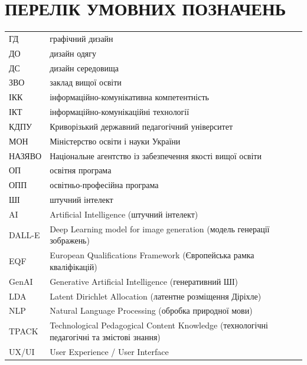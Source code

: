 \section*{\centering ПЕРЕЛІК УМОВНИХ ПОЗНАЧЕНЬ}

\begin{longtable}{@{}p{}p{}@{}}

ГД   & графічний дизайн \\
ДО   & дизайн одягу \\
ДС   & дизайн середовища \\
ЗВО  & заклад вищої освіти \\
ІКК  & інформаційно-комунікативна компетентність \\
ІКТ  & інформаційно-комунікаційні технології \\
КДПУ & Криворізький державний педагогічний університет \\
МОН  & Міністерство освіти і науки України \\
НАЗЯВО & Національне агентство із забезпечення якості вищої освіти \\
ОП   & освітня програма \\
ОПП  & освітньо-професійна програма \\
ШІ   & штучний інтелект \\

\addlinespace[6pt]
AI       & Artificial Intelligence (штучний інтелект) \\
DALL-E   & Deep Learning model for image generation (модель генерації зображень) \\
EQF      & European Qualifications Framework (Європейська рамка кваліфікацій) \\
GenAI    & Generative Artificial Intelligence (генеративний ШІ) \\
LDA      & Latent Dirichlet Allocation (латентне розміщення Діріхле) \\
NLP      & Natural Language Processing (обробка природної мови) \\
TPACK    & Technological Pedagogical Content Knowledge (технологічні педагогічні та змістові знання) \\
UX/UI    & User Experience / User Interface \\

\end{longtable}
